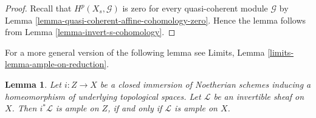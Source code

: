\documentclass{stacks-project}
\theoremstyle{plain}
\newtheorem{lemma}[subsection]{Lemma}
\theoremstyle{definition}
\theoremstyle{remark}
\numberwithin{equation}{subsection}
\begin{document}
\begin{proof}
Recall that $H^p(X_s, \mathcal{G})$ is zero for every quasi-coherent
module $\mathcal{G}$ by
Lemma \ref{lemma-quasi-coherent-affine-cohomology-zero}.
Hence the lemma follows from
Lemma \ref{lemma-invert-s-cohomology}.
\end{proof}

\noindent
For a more general version of the following lemma see
Limits, Lemma \ref{limits-lemma-ample-on-reduction}.

\begin{lemma}
\label{lemma-ample-on-reduction}
Let $i : Z \to X$ be a closed immersion of Noetherian schemes
inducing a homeomorphism of underlying topological spaces.
Let $\mathcal{L}$ be an invertible sheaf on $X$.
Then $i^*\mathcal{L}$ is ample on $Z$, if and only if
$\mathcal{L}$ is ample on $X$.
\end{lemma}
\end{document}
